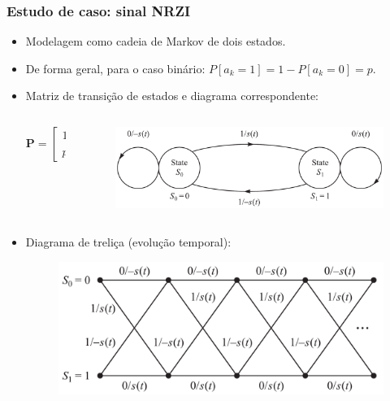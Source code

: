 \begin{frame}
	\frametitle{Estudo de caso: sinal NRZI}

	\begin{itemize}
	    \item Modelagem como cadeia de Markov de dois estados.
	    \item De forma geral, para o caso binário: $P[a_k=1]=1-P[a_k=0]=p$.
	    \item Matriz de transição de estados e diagrama correspondente:
	    \begin{columns}
		\begin{column}{0.35\textwidth}
		    \begin{equation*}
			\mathbf{P} = \left[ \begin{array}{cc} 1-p & p \\ p & 1-p \end{array} \right]
		    \end{equation*}
		\end{column}
		\begin{column}{0.65\textwidth}
		     \begin{figure}[t]	
		      \begin{center}
			\includegraphics[width=0.85\columnwidth]{figs/pam_36}
		      \end{center}
		    \end{figure}
		\end{column}
	    \end{columns}	 
	    \item Diagrama de treliça (evolução temporal):
	    \begin{figure}[t]	
	      \begin{center}
		\includegraphics[width=0.5\columnwidth]{figs/pam_37}
	      \end{center}
	    \end{figure}
	\end{itemize}
\end{frame}

